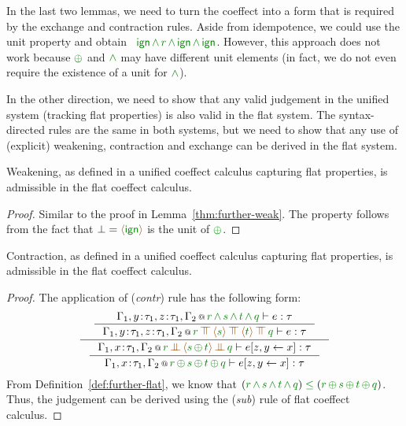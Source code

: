 \noindent
In the last two lemmas, we need to turn the coeffect into a form that is required by the exchange
and contraction rules. Aside from idempotence, we could use the unit property and obtain
\eg~$\czero\,\czip\,\cclrd{r}\,\czip\,\czero\,\czip\,\czero$. However, this approach does not
work because $\cpar$ and $\czip$ may have different unit elements (in fact, we do not even require
the existence of a unit for $\czip$).

In the other direction, we need to show that any valid judgement in the unified system (tracking
flat properties) is also valid in the flat system. The syntax-directed rules are the same in both
systems, but we need to show that any use of (explicit) weakening, contraction and exchange can be
derived in the flat system.

\begin{lemma}
Weakening, as defined in a unified coeffect calculus capturing flat properties, is admissible in
the flat coeffect calculus.
\end{lemma}
\begin{proof}
Similar to the proof in Lemma~\ref{thm:further-weak}. The property follows from the fact that
$\bot=\alift{\czero}$ is the unit of $\cpar$.
\end{proof}

\begin{lemma}
\label{thm:further-rev-contr}
Contraction, as defined in a unified coeffect calculus capturing flat properties, is admissible in
the flat coeffect calculus.
\end{lemma}
\begin{proof}
The application of (\emph{contr}) rule has the following form:
\begin{equation*}
\inference
 { \inference
    {\coctx{\Gamma_1,y\!:\!\tau_1,z\!:\!\tau_1,\Gamma_2}{\cclrd{r} \,\czip\, \cclrd{s} \,\czip\, \cclrd{t} \,\czip\, \cclrd{q}} \vdash e : \tau}
    {\coctx{\Gamma_1,y\!:\!\tau_1,z\!:\!\tau_1,\Gamma_2}{\cclrd{r} \,\azip\, \alift{\cclrd{s}} \,\azip\, \alift{\cclrd{t}} \,\azip\, \cclrd{q}} \vdash e : \tau} }
 { \inference
    {\coctx{\Gamma_1,x\!:\!\tau_1,\Gamma_2}{\cclrd{r} \,\apar\, \alift{\cclrd{s} \,\cpar\, \cclrd{t}} \,\apar\, \cclrd{q}} \vdash \subst{e}{z,y}{x} : \tau}
    {\coctx{\Gamma_1,x\!:\!\tau_1,\Gamma_2}{\cclrd{r} \,\cpar\, \cclrd{s} \,\cpar\, \cclrd{t} \,\cpar\, \cclrd{q}} \vdash \subst{e}{z,y}{x} : \tau} }
\end{equation*}
%
From Definition~\ref{def:further-flat}, we know that $(\cclrd{r} \,\czip\, \cclrd{s} \,\czip\, \cclrd{t} \,\czip\, \cclrd{q})
\;\cleq\; (\cclrd{r} \,\cpar\, \cclrd{s} \,\cpar\, \cclrd{t} \,\cpar\, \cclrd{q})$. Thus, the judgement
 can be derived using the (\emph{sub}) rule of flat coeffect calculus.
\end{proof}


